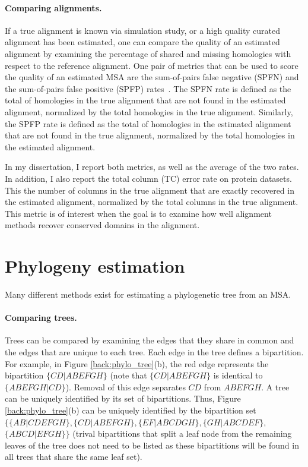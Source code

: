 \paragraph{Comparing alignments.}  If a true alignment is known via simulation study, or a high quality curated alignment has been estimated, one can compare the quality of an estimated alignment by examining the percentage of shared and missing homologies with respect to the reference alignment.  One pair of metrics that can be used to score the quality of an estimated MSA are the sum-of-pairs false negative (SPFN) and the sum-of-pairs false positive (SPFP) rates~\cite{todo}.  The SPFN rate is defined as the total of homologies in the true alignment that are not found in the estimated alignment, normalized by the total homologies in the true alignment.  Similarly, the SPFP rate is defined as the total of homologies in the estimated alignment that are not found in the true alignment, normalized by the total homologies in the estimated alignment.  

In my dissertation, I report both metrics, as well as the average of the two rates.  In addition, I also report the total column (TC) error rate on protein datasets.  This the number of columns in the true alignment that are exactly recovered in the estimated alignment, normalized by the total columns in the true alignment.  This metric is of interest when the goal is to examine how well alignment methods recover conserved domains in the alignment.



\section{Phylogeny estimation}\label{back:tree_estimation}
Many different methods exist for estimating a phylogenetic tree from an MSA.  


\paragraph{Comparing trees.}  

Trees can be compared by examining the edges that they share in common and the edges that are unique to each tree.  Each edge in the tree defines a bipartition.  For example, in Figure \ref{back:phylo_tree}(b), the red edge represents the bipartition $\{CD|ABEFGH\}$ (note that $\{CD|ABEFGH\}$ is identical to $\{ABEFGH|CD\}$).  Removal of this edge separates $CD$ from $ABEFGH$.  A tree can be uniquely identified by its set of bipartitions.  Thus, Figure \ref{back:phylo_tree}(b) can be uniquely identified by the bipartition set $\{\{AB|CDEFGH\}, \{CD|ABEFGH\}, \{EF|ABCDGH\},\{GH|ABCDEF\},$ $\{ABCD|EFGH\}\}$ (trival bipartitions that split a leaf node from the remaining leaves of the tree does not need to be listed as these bipartitions will be found in all trees that share the same leaf set).

